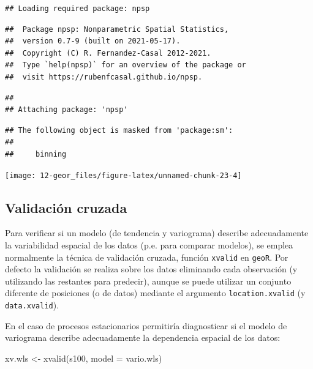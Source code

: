 \documentclass[
  spanish,
]{book}
\newenvironment{Shaded}{\begin{snugshade}}{\end{snugshade}}
\newcommand{\AttributeTok}[1]{\textcolor[rgb]{0.77,0.63,0.00}{#1}}
\newcommand{\FunctionTok}[1]{\textcolor[rgb]{0.00,0.00,0.00}{#1}}
\newcommand{\NormalTok}[1]{#1}
\newcommand{\OtherTok}[1]{\textcolor[rgb]{0.56,0.35,0.01}{#1}}
\theoremstyle{break}
\begin{document}
\begin{verbatim}
## Loading required package: npsp
\end{verbatim}

\begin{verbatim}
##  Package npsp: Nonparametric Spatial Statistics,
##  version 0.7-9 (built on 2021-05-17).
##  Copyright (C) R. Fernandez-Casal 2012-2021.
##  Type `help(npsp)` for an overview of the package or
##  visit https://rubenfcasal.github.io/npsp.
\end{verbatim}

\begin{verbatim}
## 
## Attaching package: 'npsp'
\end{verbatim}

\begin{verbatim}
## The following object is masked from 'package:sm':
## 
##     binning
\end{verbatim}

\begin{center}\texttt{[image: 12-geor\_files/figure-latex/unnamed-chunk-23-4]} \end{center}

\hypertarget{validaciuxf3n-cruzada}{%
\subsection{Validación cruzada}\label{validaciuxf3n-cruzada}}

Para verificar si un modelo (de tendencia y variograma) describe adecuadamente
la variabilidad espacial de los datos (p.e. para comparar modelos), se emplea
normalmente la técnica de validación cruzada, función \texttt{xvalid} en \texttt{geoR}.
Por defecto la validación se realiza sobre los datos eliminando cada
observación (y utilizando las restantes para predecir), aunque se puede
utilizar un conjunto diferente de posiciones (o de datos) mediante el
argumento \texttt{location.xvalid} (y \texttt{data.xvalid}).

En el caso de procesos estacionarios permitiría diagnosticar si el modelo de
variograma describe adecuadamente la dependencia espacial de los datos:

\begin{Shaded}
\begin{Highlighting}[]
\NormalTok{xv.wls }\OtherTok{\textless{}{-}} \FunctionTok{xvalid}\NormalTok{(s100, }\AttributeTok{model =}\NormalTok{ vario.wls)}
\end{Highlighting}
\end{Shaded}
\end{document}
